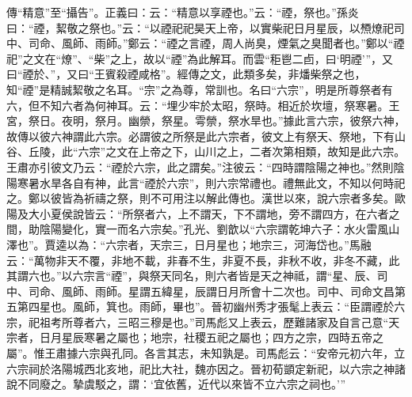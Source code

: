 {\noindent\zhuan{}\fzbyks 傳“精意”至“攝告”。正義曰：云：“精意以享禋也。”云：“禋，祭也。”孫炎曰：“禋，絜敬之祭也。”云：“以禋祀祀昊天上帝，以實柴祀日月星辰，以槱燎祀司中、司命、風師、雨師。”鄭云：“禋之言禋，周人尚臭，煙氣之臭聞者也。”鄭以“禋祀”之文在“燎”、“柴”之上，故以“禋”為此解耳。而雲“秬鬯二卣，曰‘明禋’”，又曰“禋於、”，又曰“王賓殺禋咸格”。經傳之文，此類多矣，非燔柴祭之也，知“禋”是精誠絜敬之名耳。“宗”之為尊，常訓也。名曰“六宗”，明是所尊祭者有六，但不知六者為何神耳。云：“埋少牢於太昭，祭時。相近於坎壇，祭寒暑。王宮，祭日。夜明，祭月。幽禜，祭星。雩禜，祭水旱也。”據此言六宗，彼祭六神，故傳以彼六神謂此六宗。必謂彼之所祭是此六宗者，彼文上有祭天、祭地，下有山谷、丘陵，此“六宗”之文在上帝之下，山川之上，二者次第相類，故知是此六宗。王肅亦引彼文乃云：“禋於六宗，此之謂矣。”注彼云：“四時謂陰陽之神也。”然則陰陽寒暑水旱各自有神，此言“禋於六宗”，則六宗常禮也。禮無此文，不知以何時祀之。鄭以彼皆為祈禱之祭，則不可用注以解此傳也。漢世以來，說六宗者多矣。歐陽及大小夏侯說皆云：“所祭者六，上不謂天，下不謂地，旁不謂四方，在六者之間，助陰陽變化，實一而名六宗矣。”孔光、劉歆以“六宗謂乾坤六子：水火雷風山澤也”。賈逵以為：“六宗者，天宗三，日月星也；地宗三，河海岱也。”馬融云：“萬物非天不覆，非地不載，非春不生，非夏不長，非秋不收，非冬不藏，此其謂六也。”以六宗言“禋”，與祭天同名，則六者皆是天之神祗，謂“星、辰、司中、司命、風師、雨師。星謂五緯星，辰謂日月所會十二次也。司中、司命文昌第五第四星也。風師，箕也。雨師，畢也”。晉初幽州秀才張髦上表云：“臣謂禋於六宗，祀祖考所尊者六，三昭三穆是也。”司馬彪又上表云，歷難諸家及自言己意“天宗者，日月星辰寒暑之屬也；地宗，社稷五祀之屬也；四方之宗，四時五帝之屬”。惟王肅據六宗與孔同。各言其志，未知孰是。司馬彪云：“安帝元初六年，立六宗祠於洛陽城西北亥地，祀比大社，魏亦因之。晉初荀顗定新祀，以六宗之神諸說不同廢之。摯虞駁之，謂：‘宜依舊，近代以來皆不立六宗之祠也。’” \par}

